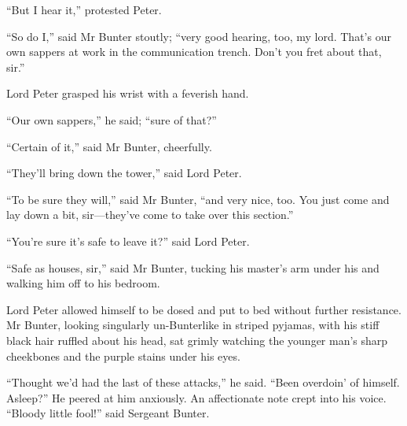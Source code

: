\enquote{But I hear it,} protested Peter.

\enquote{So do I,} said Mr Bunter stoutly; \enquote{very good hearing, too, my lord. That’s our own sappers at work in the communication trench. Don’t you fret about that, sir.}

Lord Peter grasped his wrist with a feverish hand.

\enquote{Our own sappers,} he said; \enquote{sure of that?}

\enquote{Certain of it,} said Mr Bunter, cheerfully.

\enquote{They’ll bring down the tower,} said Lord Peter.

\enquote{To be sure they will,} said Mr Bunter, \enquote{and very nice, too. You just come and lay down a bit, sir\allowbreak---\allowbreak they’ve come to take over this section.}

\enquote{You’re sure it’s safe to leave it?} said Lord Peter.

\enquote{Safe as houses, sir,} said Mr Bunter, tucking his master’s arm under his and walking him off to his bedroom.

Lord Peter allowed himself to be dosed and put to bed without further resistance. Mr Bunter, looking singularly un-Bunterlike in striped pyjamas, with his stiff black hair ruffled about his head, sat grimly watching the younger man’s sharp cheekbones and the purple stains under his eyes.

\enquote{Thought we’d had the last of these attacks,} he said. \enquote{Been overdoin’ of himself. Asleep?} He peered at him anxiously. An affectionate note crept into his voice. \enquote{Bloody little fool!} said Sergeant Bunter.
